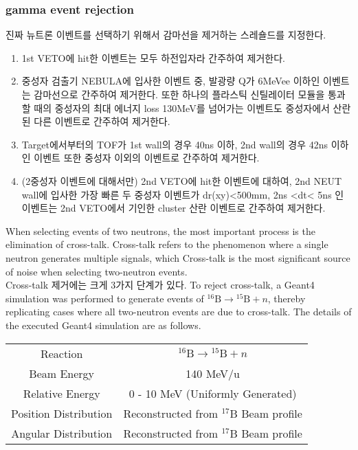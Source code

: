 \subsubsection{gamma event rejection}
진짜 뉴트론 이벤트를 선택하기 위해서 감마선을 제거하는 스레숄드를 지정한다.
\begin{enumerate}
    \item 1st VETO에 hit한 이벤트는 모두 하전입자라 간주하여 제거한다.
    \item 중성자 검출기 NEBULA에 입사한 이벤트 중, 발광량 Q가 6MeVee 이하인 이벤트는 감마선으로 간주하여 제거한다. 또한 하나의 플라스틱 신틸레이터 모듈을 통과할 때의 중성자의 최대 에너지 loss 130MeV를 넘어가는 이벤트도 중성자에서 산란된 다른 이벤트로 간주하여 제거한다.
    \item Target에서부터의 TOF가 1st wall의 경우 40ns 이하, 2nd wall의 경우 42ns 이하인 이벤트 또한 중성자 이외의 이벤트로 간주하여 제거한다.
    \item (2중성자 이벤트에 대해서만) 2nd VETO에 hit한 이벤트에 대하여, 2nd NEUT wall에 입사한 가장 빠른 두 중성자 이벤트가 dr(xy)<500mm, 2ns <dt< 5ns 인 이벤트는 2nd VETO에서 기인한 cluster 산란 이벤트로 간주하여 제거한다.
\end{enumerate}

When selecting events of two neutrons, the most important process is the elimination of cross-talk. Cross-talk refers to the phenomenon where a single neutron generates multiple signals, which  Cross-talk is the most significant source of noise when selecting two-neutron events. \\
Cross-talk 제거에는 크게 3가지 단계가 있다. 
To reject cross-talk, a Geant4 simulation was performed to generate events of ${}^{16}\text{B} \to {}^{15}\text{B}+n$, thereby replicating cases where all two-neutron events are due to cross-talk. The details of the executed Geant4 simulation are as follows.
\begin{center}
    \begin{tabular}[h]{c|c}
        \hline \hline
        Reaction & ${}^{16}\text{B} \to {}^{15}\text{B}+n$ \\
        Beam Energy & 140 MeV/u\\
        Relative Energy & 0 - 10 MeV (Uniformly Generated)\\
        Position Distribution & Reconstructed from ${}^{17}$B Beam profile\\
        Angular Distribution & Reconstructed from ${}^{17}$B Beam profile \\
        \hline \hline
    \end{tabular}
\end{center}
